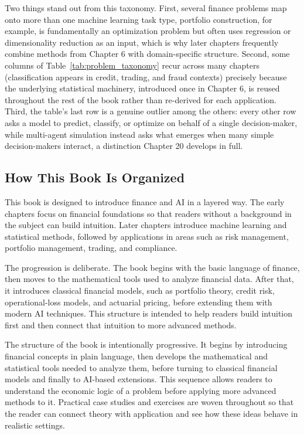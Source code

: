 \documentclass[../ai_in_finance]{subfiles}
\begin{document}
Two things stand out from this taxonomy. First, several finance problems map onto more than one machine learning task type, portfolio construction, for example, is fundamentally an optimization problem but often uses regression or dimensionality reduction as an input, which is why later chapters frequently combine methods from Chapter 6 with domain-specific structure. Second, some columns of Table~\ref{tab:problem_taxonomy} recur across many chapters (classification appears in credit, trading, and fraud contexts) precisely because the underlying statistical machinery, introduced once in Chapter 6, is reused throughout the rest of the book rather than re-derived for each application. Third, the table's last row is a genuine outlier among the others: every other row asks a model to predict, classify, or optimize on behalf of a single decision-maker, while multi-agent simulation instead asks what emerges when many simple decision-makers interact, a distinction Chapter 20 develops in full.

\subsection{How This Book Is Organized}

This book is designed to introduce finance and AI in a layered way. The early chapters focus on financial foundations so that readers without a background in the subject can build intuition. Later chapters introduce machine learning and statistical methods, followed by applications in areas such as risk management, portfolio management, trading, and compliance.

The progression is deliberate. The book begins with the basic language of finance, then moves to the mathematical tools used to analyze financial data. After that, it introduces classical financial models, such as portfolio theory, credit risk, operational-loss models, and actuarial pricing, before extending them with modern AI techniques. This structure is intended to help readers build intuition first and then connect that intuition to more advanced methods.

The structure of the book is intentionally progressive. It begins by introducing financial concepts in plain language, then develops the mathematical and statistical tools needed to analyze them, before turning to classical financial models and finally to AI-based extensions. This sequence allows readers to understand the economic logic of a problem before applying more advanced methods to it. Practical case studies and exercises are woven throughout so that the reader can connect theory with application and see how these ideas behave in realistic settings.
\end{document}
